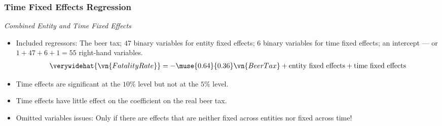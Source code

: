 \begin{frame}
\frametitle{Time Fixed Effects Regression}
\emph{Combined Entity and Time Fixed Effects}
\begin{itemize}
\item Included regressors: The beer tax; $47$ binary variables for entity fixed effects; $6$ binary variables for time fixed effects; an intercept --- or $1 + 47 + 6 + 1 = 55$ right-hand variables.
\begin{align*}
\verywidehat{\vn{FatalityRate}}
  = -\muse{0.64}{0.36} \vn{BeerTax} + \text{entity fixed effects} + \text{time fixed effects}
\end{align*}
\item Time effects are significant at the $10\%$ level but not at the $5\%$ level.
\item Time effects have little effect on the coefficient on the real beer tax.
\item Omitted variables issues: 
\newlinequad
Only if there are effects that are neither fixed across entities nor fixed across time!
\end{itemize}
\end{frame}
